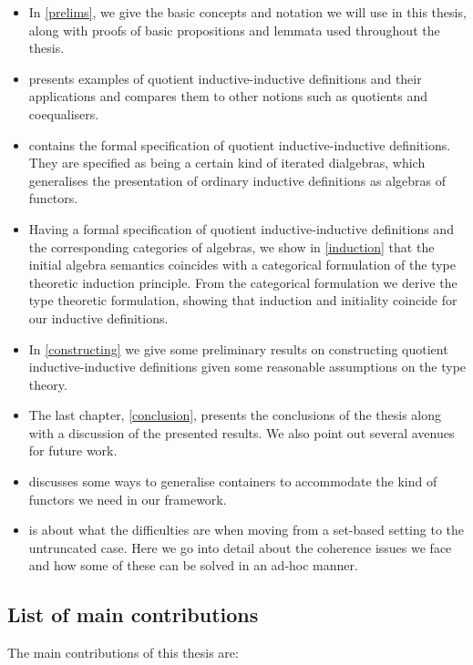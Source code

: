 \begin{itemize}
\item In \cref{prelims}, we give the basic concepts and notation we
  will use in this thesis, along with proofs of basic propositions and
  lemmata used throughout the thesis.
\item {} presents examples of quotient inductive-inductive
  definitions and their applications and compares them to other
  notions such as quotients and coequalisers.
\item {} contains the formal specification of quotient
  inductive-inductive definitions. They are specified as being a
  certain kind of iterated dialgebras, which generalises the
  presentation of ordinary inductive definitions as algebras of
  functors.
\item Having a formal specification of quotient inductive-inductive
  definitions and the corresponding categories of algebras, we show in
  \cref{induction} that the initial algebra semantics coincides with a
  categorical formulation of the type theoretic induction
  principle. From the categorical formulation we derive the type
  theoretic formulation, showing that induction and initiality
  coincide for our inductive definitions.
\item In \cref{constructing} we give some preliminary results on
  constructing quotient inductive-inductive definitions given some
  reasonable assumptions on the type theory.
\item The last chapter, \cref{conclusion}, presents the conclusions of
  the thesis along with a discussion of the presented results. We also
  point out several avenues for future work.
\item {} discusses some ways to generalise containers
  to accommodate the kind of functors we need in our framework.
\item {} is about what the difficulties are when
  moving from a set-based setting to the untruncated case. Here we go
  into detail about the coherence issues we face and how some of these
  can be solved in an ad-hoc manner.
\end{itemize}

\subsection{List of main contributions}

The main contributions of this thesis are:

